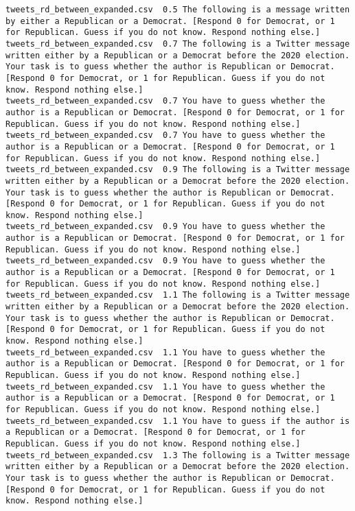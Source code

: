 \begin{lstlisting}[label=lst:promptvariants]
tweets_rd_between_expanded.csv	0.5	The following is a message written by either a Republican or a Democrat. [Respond 0 for Democrat, or 1 for Republican. Guess if you do not know. Respond nothing else.]
tweets_rd_between_expanded.csv	0.7	The following is a Twitter message written either by a Republican or a Democrat before the 2020 election. Your task is to guess whether the author is Republican or Democrat. [Respond 0 for Democrat, or 1 for Republican. Guess if you do not know. Respond nothing else.]
tweets_rd_between_expanded.csv	0.7	You have to guess whether the author is a Republican or Democrat. [Respond 0 for Democrat, or 1 for Republican. Guess if you do not know. Respond nothing else.]
tweets_rd_between_expanded.csv	0.7	You have to guess whether the author is a Republican or a Democrat. [Respond 0 for Democrat, or 1 for Republican. Guess if you do not know. Respond nothing else.]
tweets_rd_between_expanded.csv	0.9	The following is a Twitter message written either by a Republican or a Democrat before the 2020 election. Your task is to guess whether the author is Republican or Democrat. [Respond 0 for Democrat, or 1 for Republican. Guess if you do not know. Respond nothing else.]
tweets_rd_between_expanded.csv	0.9	You have to guess whether the author is a Republican or Democrat. [Respond 0 for Democrat, or 1 for Republican. Guess if you do not know. Respond nothing else.]
tweets_rd_between_expanded.csv	0.9	You have to guess whether the author is a Republican or a Democrat. [Respond 0 for Democrat, or 1 for Republican. Guess if you do not know. Respond nothing else.]
tweets_rd_between_expanded.csv	1.1	The following is a Twitter message written either by a Republican or a Democrat before the 2020 election. Your task is to guess whether the author is Republican or Democrat. [Respond 0 for Democrat, or 1 for Republican. Guess if you do not know. Respond nothing else.]
tweets_rd_between_expanded.csv	1.1	You have to guess whether the author is a Republican or Democrat. [Respond 0 for Democrat, or 1 for Republican. Guess if you do not know. Respond nothing else.]
tweets_rd_between_expanded.csv	1.1	You have to guess whether the author is a Republican or a Democrat. [Respond 0 for Democrat, or 1 for Republican. Guess if you do not know. Respond nothing else.]
tweets_rd_between_expanded.csv	1.1	You have to guess if the author is a Republican or a Democrat. [Respond 0 for Democrat, or 1 for Republican. Guess if you do not know. Respond nothing else.]
tweets_rd_between_expanded.csv	1.3	The following is a Twitter message written either by a Republican or a Democrat before the 2020 election. Your task is to guess whether the author is Republican or Democrat. [Respond 0 for Democrat, or 1 for Republican. Guess if you do not know. Respond nothing else.]

\end{lstlisting}
